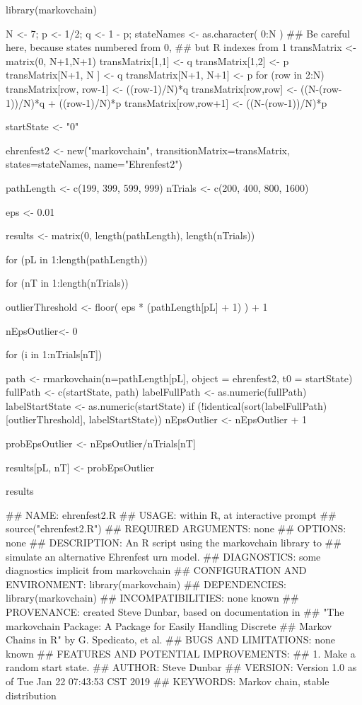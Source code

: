 \documentclass[12pt]{article}
\begin{document}
\begin{solution}

library(markovchain)

N <- 7; p <- 1/2; q <- 1 - p;
stateNames <- as.character( 0:N )
## Be careful here, because states numbered from 0,
## but R indexes from 1
transMatrix <- matrix(0, N+1,N+1)
transMatrix[1,1] <- q
transMatrix[1,2] <- p
transMatrix[N+1, N  ] <- q
transMatrix[N+1, N+1] <- p
for (row in 2:N) {
    transMatrix[row, row-1] <- ((row-1)/N)*q
    transMatrix[row,row] <- ((N-(row-1))/N)*q + ((row-1)/N)*p
    transMatrix[row,row+1] <- ((N-(row-1))/N)*p
}

startState <- "0"

ehrenfest2 <- new("markovchain", transitionMatrix=transMatrix,
                 states=stateNames, name="Ehrenfest2")


pathLength <- c(199, 399, 599, 999)
nTrials <- c(200, 400, 800, 1600)

eps <- 0.01

results <- matrix(0, length(pathLength), length(nTrials))

for (pL in 1:length(pathLength)) {
for  (nT in 1:length(nTrials)) {

outlierThreshold <- floor( eps * (pathLength[pL] + 1) ) + 1

nEpsOutlier<- 0

for (i in 1:nTrials[nT]) {
            
    path <- rmarkovchain(n=pathLength[pL],
                         object = ehrenfest2,
                         t0 = startState)
    fullPath <- c(startState, path)
    labelFullPath <- as.numeric(fullPath)
    labelStartState <- as.numeric(startState)
    if (!identical(sort(labelFullPath)[outlierThreshold], labelStartState)) {
                nEpsOutlier <- nEpsOutlier + 1
    }
}

probEpsOutlier <- nEpsOutlier/nTrials[nT]

results[pL, nT] <- probEpsOutlier
}
}

results

## NAME: ehrenfest2.R
## USAGE: within R, at interactive prompt
##        source("ehrenfest2.R")
## REQUIRED ARGUMENTS: none
## OPTIONS: none
## DESCRIPTION: An R script using the markovchain library to 
##              simulate an alternative Ehrenfest urn model.            
## DIAGNOSTICS: some diagnostics implicit from markovchain
## CONFIGURATION AND ENVIRONMENT:  library(markovchain)
## DEPENDENCIES:  library(markovchain)
## INCOMPATIBILITIES: none known
## PROVENANCE: created Steve Dunbar, based on documentation in
## "The markovchain Package: A Package for Easily Handling Discrete
##  Markov Chains in R" by G. Spedicato, et al.
## BUGS AND LIMITATIONS: none known
## FEATURES AND POTENTIAL IMPROVEMENTS:
## 1.  Make a random start state.
## AUTHOR:  Steve Dunbar
## VERSION: Version 1.0 as of Tue Jan 22 07:43:53 CST 2019
## KEYWORDS: Markov chain, stable distribution



\end{solution}
\end{document}
